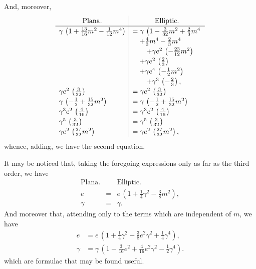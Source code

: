 \documentclass[11pt]{article}
\begin{document}
And, moreover,
\[
\renewcommand{\arraystretch}{1.2}
\begin{array}{l|l}
\multicolumn{1}{c|}{\text{Plana.}} & \multicolumn{1}{c}{\text{Elliptic.}} \\
\hline
\gamma\,\left(1 + \tfrac{13}{16}m^{2} - \tfrac{1}{12}m^{4}\right)
   & = \gamma\,\left(1 - \tfrac{3}{32}m^{2} + \tfrac{2}{3}m^{4}\right.\\
   & \quad + \tfrac{4}{3}m^{4} - \tfrac{2}{3}m^{4} \\
   & \quad\quad + \gamma e^{2}\,\left(-\tfrac{23}{12}m^{2}\right) \\
   & \quad + \gamma e^{2}\,\left(\tfrac{2}{3}\right) \\
   & \quad + \gamma e^{4}\,\left(-\tfrac{1}{2}m^{2}\right) \\
   & \quad\quad + \gamma^{3}\,\left(-\tfrac{2}{3}\right), \\
\gamma e^{2}\,\left(\tfrac{3}{32}\right) & = \gamma e^{2}\,\left(\tfrac{3}{32}\right) \\
\gamma\,\left(-\tfrac{1}{2} + \tfrac{15}{32}m^{2}\right)
   & = \gamma\,\left(-\tfrac{1}{2} + \tfrac{15}{32}m^{2}\right) \\
\gamma^{3}e^{2}\,\left(\tfrac{4}{16}\right) & = \gamma^{3}e^{2}\,\left(\tfrac{4}{16}\right) \\
\gamma^{5}\,\left(\tfrac{3}{32}\right) & = \gamma^{5}\,\left(\tfrac{3}{32}\right) \\
\gamma e^{2}\,\left(\tfrac{27}{32}m^{2}\right) & = \gamma e^{2}\,\left(\tfrac{27}{32}m^{2}\right),
\end{array}
\]
whence, adding, we have the second equation.

It may be noticed that, taking the foregoing expressions only as far
as the third order, we have
\[
\begin{array}{lll}
\text{Plana.} & & \text{Elliptic.} \\
e & = & e\,(1 + \tfrac{1}{4}\gamma^{2} - \tfrac{3}{8}m^{2}), \\
\gamma & = & \gamma.
\end{array}
\]
And moreover that, attending only to the terms which are independent
of $m$, we have
\begin{align*}
e &= e\,(1 + \tfrac{1}{4}\gamma^{2} - \tfrac{3}{8}e^{2}\gamma^{2} + \tfrac{1}{4}\gamma^{4}), \\
\gamma &= \gamma\,(1 - \tfrac{3}{16}e^{2} + \tfrac{4}{16}e^{2}\gamma^{2} - \tfrac{1}{2}\gamma^{4}).
\end{align*}
which are formulae that may be found useful.
\end{document}
